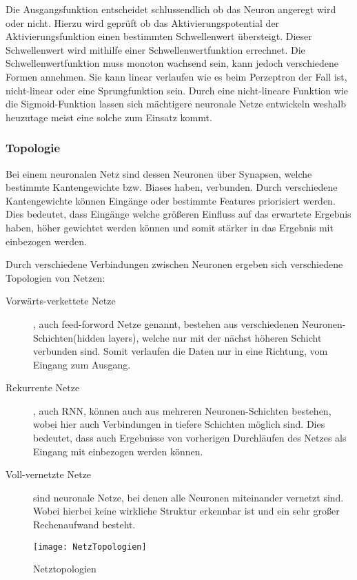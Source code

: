     \noindent
    Die Ausgangsfunktion entscheidet schlussendlich ob das Neuron angeregt wird oder nicht.
    Hierzu wird geprüft ob das Aktivierungspotential der Aktivierungsfunktion einen bestimmten Schwellenwert übersteigt.
    Dieser Schwellenwert wird mithilfe einer Schwellenwertfunktion errechnet. 
    Die Schwellenwertfunktion muss monoton wachsend sein, kann jedoch verschiedene Formen annehmen. 
    Sie kann linear verlaufen wie es beim Perzeptron der Fall ist, nicht-linear oder eine Sprungfunktion sein. 
    Durch eine nicht-lineare Funktion wie die Sigmoid-Funktion lassen sich mächtigere neuronale Netze entwickeln weshalb heuzutage meist eine solche zum Einsatz kommt.


    \subsubsection{Topologie}
    Bei einem neuronalen Netz sind dessen Neuronen über Synapsen, welche bestimmte Kantengewichte bzw. Biases haben, verbunden.
    Durch verschiedene Kantengewichte können Eingänge oder bestimmte Features priorisiert werden. 
    Dies bedeutet, dass Eingänge welche größeren Einfluss auf das erwartete Ergebnis haben, höher gewichtet werden können und somit stärker in das Ergebnis mit einbezogen werden.
    \newline

    \noindent
    Durch verschiedene Verbindungen zwischen Neuronen ergeben sich verschiedene Topologien von Netzen:
    \begin{description}
        \item[Vorwärts-verkettete Netze], auch feed-forword Netze genannt, bestehen aus verschiedenen Neuronen-Schichten(hidden layers), welche nur mit der nächst höheren Schicht verbunden sind. Somit verlaufen die Daten nur in eine Richtung, vom Eingang zum Ausgang.
        \item[Rekurrente Netze], auch \ac{RNN}, können auch aus mehreren Neuronen-Schichten bestehen, wobei hier auch Verbindungen in tiefere Schichten möglich sind. Dies bedeutet, dass auch Ergebnisse von vorherigen Durchläufen des Netzes als Eingang mit einbezogen werden können.
        \item[Voll-vernetzte Netze] sind neuronale Netze, bei denen alle Neuronen miteinander vernetzt sind. Wobei hierbei keine wirkliche Struktur erkennbar ist und ein sehr großer Rechenaufwand besteht.
    \end{description}

    \begin{figure}[H]
        \centering
        \texttt{[image: NetzTopologien]}
        \caption{Netztopologien \cite{DrawIO}}
        \label{fig:NetzTopologien}
    \end{figure}


